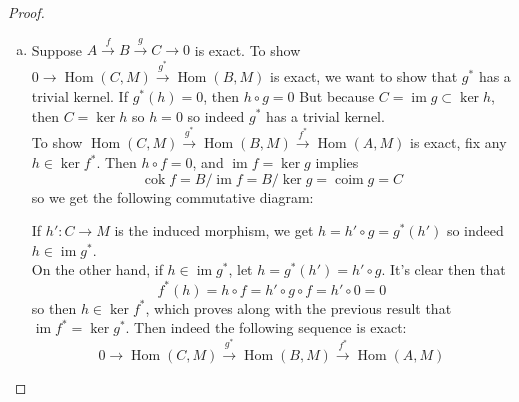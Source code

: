 \documentclass{article}
\DeclareMathOperator{\im}{\mathrm{im}}
\DeclareMathOperator{\coim}{\mathrm{coim}}
\DeclareMathOperator{\cok}{\mathrm{cok}}
\DeclareMathOperator{\Hom}{\mathrm{Hom}}
\begin{document}
\begin{proof}
\begin{enumerate}[(a)]
    \item 
    Suppose $A\xrightarrow{f}B\xrightarrow{g}C\rightarrow 0$ is exact. To show $0\rightarrow \Hom(C,M) \xrightarrow{g^*} \Hom(B,M)$ is exact, we want to show that $g^*$ has a trivial kernel. If $g^*(h)=0$, then $h\circ g=0$ But because $C=\im g\subset \ker h$, then $C=\ker h$ so $h=0$ so indeed $g^*$ has a trivial kernel.\\
    To show $\Hom(C,M)\xrightarrow{g^*} \Hom(B,M) \xrightarrow{f^*} \Hom(A,M)$ is exact, fix any $h\in \ker f^*$. Then $h\circ f=0$, and $\im f=\ker g$ implies 
    \[
    \cok f=B/\im f=B/\ker g=\coim g=C
    \]
    so we get the following commutative diagram:
    \begin{center}
    \end{center}
    If $h':C\to M$ is the induced morphism, we get $h=h'\circ g=g^*(h')$ so indeed $h\in \im g^*$.\\
    On the other hand, if $h\in \im g^*$, let $h=g^*(h')=h'\circ g$. It's clear then that
    \[
    f^*(h)=h\circ f=h'\circ g\circ f=h'\circ 0=0
    \]
    so then $h\in \ker f^*$, which proves along with the previous result that $\im f^*=\ker g^*$. Then indeed the following sequence is exact:
    \[
    0\rightarrow \Hom(C,M) \xrightarrow{g^*} \Hom(B,M) \xrightarrow{f^*} \Hom(A,M)
    \]
    \end{enumerate}
    
\end{proof}
\end{document}
